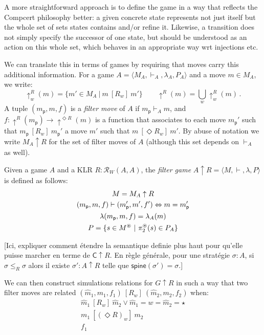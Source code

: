 \documentclass[acmsmall,anonymous]{acmart}
\newcommand{\kw}[1]{\ensuremath{ \textsf{#1} }}
\newcommand{\ifr}[1]{\ [{#1}]\ }
\newcommand{\EC}{\kw{C}}
\begin{document}
A more straightforward approach
is to define the game in a way that reflects
the Compcert philosophy better:
a given concrete state represents not just itself
but the whole set of sets states contains and/or refine it.
Likewise,
a transition does not simply specify the successor of one state,
but should be understood as an action on this whole set,
which behaves in an appropriate way
wrt injections etc.

We can translate this in terms of games
by requiring that moves carry this additional information.
For a game $A = \langle M_A, \vdash_A, \lambda_A, P_A \rangle$
and a move $m \in M_A$,
we write:
\[
  {\uparrow^R_w}(m) = \{ m' \in M_A \ |\ m \ifr{R_w} m' \} \hspace{2em}
  {\uparrow^R}(m) = \bigcup_w {\uparrow^R_w}(m) \,.
\]
A tuple $(m_\kw{p}, m, f)$ is a \emph{filter move} of $A$
if $m_\kw{p} \vdash_A m$,
and $f : {\uparrow^R}(m_\kw{p}) \rightarrow {\uparrow^{\Diamond R}}(m)$
is a function that associates
to each move $m_\kw{p}'$ such that $m_\kw{p} \ifr{R_w} m_\kw{p}'$
a move $m'$ such that $m \ifr{\Diamond R_w} m'$.
By abuse of notation we write $M_A \uparrow R$
for the set of filter moves of $A$
(although this set depends on $\vdash_A$ as well).

\begin{definition}
Given a game $A$ and a KLR $R : \mathcal{R}_W(A, A)$,
the \emph{filter game} $A \uparrow R = \langle M, \vdash, \lambda, P \rangle$
is defined as follows:
\begin{gather*}
  M = M_A \uparrow R \\
  (m_\kw{p}, m, f) \vdash (m_\kw{p}', m', f') \Leftrightarrow m = m_\kw{p}' \\
  \lambda(m_\kw{p}, m, f) = \lambda_A(m) \\
  P = \{ s \in M^\oast \ |\ \pi_2^\oast(s) \in P_A \}
\end{gather*}
\end{definition}

[Ici,
expliquer comment \'etendre la semantique definie plus haut
pour qu'elle puisse marcher en terme de $\EC \uparrow R$.
En r\`egle g\'en\'erale, pour
une strat\'egie $\sigma : A$,
si $\sigma \le_R \sigma$
alors il existe $\sigma' : A \uparrow R$
telle que $\kw{spine}(\sigma') = \sigma$.]

We can then construct simulations relations for $G \uparrow R$
in such a way that two filter moves are related
$(\hat{m}_1, m_1, f_1) \ifr{R_w} (\hat{m}_2, m_2, f_2)$ when:
\begin{gather*}
  \hat{m}_1 \ifr{R_w} \hat{m}_2 \vee \hat{m}_1 = w = \hat{m}_2 = \star\\
  m_1 \ifr{(\Diamond R)_w} m_2 \\
  f_1
\end{gather*}
\end{document}
